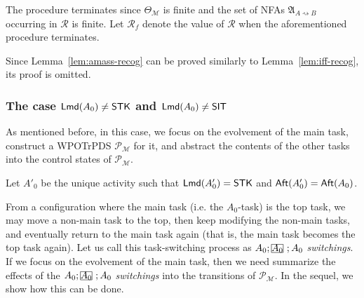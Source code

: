 \documentclass[preprint,12pt]{elsarticle}
\newcommand\rectangled[1]{\tikz[baseline=(torect.base)]{
    \node[shape = rectangle, draw, inner sep=0pt, outer sep = 0pt] (torect) {#1}
    }
}
\newcommand{\mrectangled}[1]{\text{\rectangled{\ensuremath{#1}}}}
\newcommand{\mhcancel}[1]{\mrectangled{#1}}
\newcommand\Mm{{\mathcal{M} }}
\newcommand\Pp{{\mathcal{P} }}
\newcommand\aft{{\sf Aft}}
\newcommand\lmd{{\sf Lmd}}
\newcommand\singletask{{\sf STK}}
\newcommand\AutReach{\mathscr{R}}
\newcommand{\STK}{\mathsf{STK}}
\newcommand{\SIT}{\mathsf{SIT}}
\newcommand\Aut{{\mathfrak{A} }}
\newcommand{\WOTrPDS}{\textsf{WPOTrPDS}}
\newcommand{\NFA}{\textsf{NFA}}
\begin{document}
\medskip

The procedure terminates since $\Theta_\Mm$ is finite and the set of {\NFA}s $\Aut_{A\rightsquigarrow B}$ occurring in $\AutReach$ is finite.
Let $\AutReach_f$ denote the value of $\AutReach$ when the aforementioned procedure terminates. 

Since Lemma~\ref{lem:amass-recog} can be proved similarly to Lemma~\ref{lem:iff-recog}, its proof is omitted. 



\subsubsection{The case $\lmd(A_0) \neq \STK$ and $\lmd(A_0) \neq \SIT$}\label{sec:amass-nostk}

As mentioned before, in this case, we focus on the evolvement of the main task, construct a {\WOTrPDS} $\Pp_{\Mm}$ for it, and abstract the contents of the other tasks into the control states of $\Pp_{\Mm}$. 

Let $A'_0$ be the unique activity such that $\lmd(A'_0) = \singletask$ and $\aft(A'_0) = \aft(A_0)$.  

From a configuration where the main task (i.e. the $A_0$-task) is the top task, we may move a non-main task to the top, then keep modifying the non-main tasks, and eventually return to the main task again (that is, the main task becomes the top task again). Let us call this task-switching process as $A_0;\mhcancel{A_0};A_0$ \emph{switchings}. If we focus on the evolvement of the main task, then we need summarize the effects of the $A_0;\mhcancel{A_0};A_0$ \emph{switchings} into the transitions of $\Pp_{\Mm}$.
In the sequel, we show how this can be done. 
\end{document}
